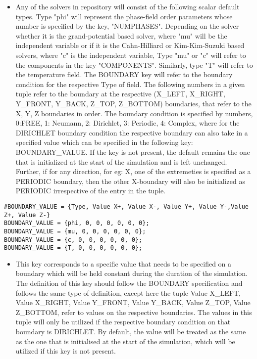 \documentclass[a4paper,10pt]{article}
\begin{document}
\begin{itemize}
 \item Any of the solvers in repository will consist of the following scalar default types. Type "phi" will represent the phase-field order parameters whose number is specified by the key, "NUMPHASES". 
 Depending on the solver whether it is the grand-potential based solver, where "mu" will be the independent variable or if it is the Cahn-Hilliard or Kim-Kim-Suzuki based solvers, 
 where "c" is the independent variable, Type "mu" or "c" will refer to the components in the key "COMPONENTS". Similarly, type "T" will refer to the temperature field. The BOUNDARY key will refer to the 
 boundary condition for the respective Type of field. The following numbers in a given tuple refer to the boundary at the respective (X\_LEFT, X\_RIGHT, Y\_FRONT, Y\_BACK, Z\_TOP, Z\_BOTTOM) boundaries, 
 that refer to the X, Y, Z boundaries in order. The boundary condition is specified by numbers, 0:FREE, 1: Neumann, 2: Dirichlet, 3: Periodic, 4: Complex, where for the DIRICHLET boundary condition the 
 respective boundary can also take in a specified value which can be specified in the following key: BOUNDARY\_VALUE. If the key is not present, the default remains the one that is initialized at the 
 start of the simulation and is left unchanged. Further, if for any direction, for eg: X, one of the extremeties is specified as a PERIODIC boundary, then the other X-boundary will also be initialized as 
 PERIODIC irrespective of the entry in the tuple. 
\end{itemize}

\begin{lstlisting}
#BOUNDARY_VALUE = {Type, Value X+, Value X-, Value Y+, Value Y-,Value Z+, Value Z-}
BOUNDARY_VALUE = {phi, 0, 0, 0, 0, 0, 0};
BOUNDARY_VALUE = {mu, 0, 0, 0, 0, 0, 0};
BOUNDARY_VALUE = {c, 0, 0, 0, 0, 0, 0};
BOUNDARY_VALUE = {T, 0, 0, 0, 0, 0, 0};
\end{lstlisting}

\begin{itemize}
 \item This key corresponds to a specific value that needs to be specified on a boundary which will be held constant during the duration of the simulation. The definition of this key should 
 follow the BOUNDARY specification and follows the same type of definition, except here the tuple Value X\_LEFT, Value X\_RIGHT, Value Y\_FRONT, Value Y\_BACK, Value Z\_TOP, Value Z\_BOTTOM, refer
 to values on the respective boundaries. The values in this tuple will only be utilized if the respective boundary condition on that boundary is DIRICHLET. By default, the value will be treated as 
 the same as the one that is initialised at the start of the simulation, which will be utilized if this key is not present. 
\end{itemize}
\end{document}
